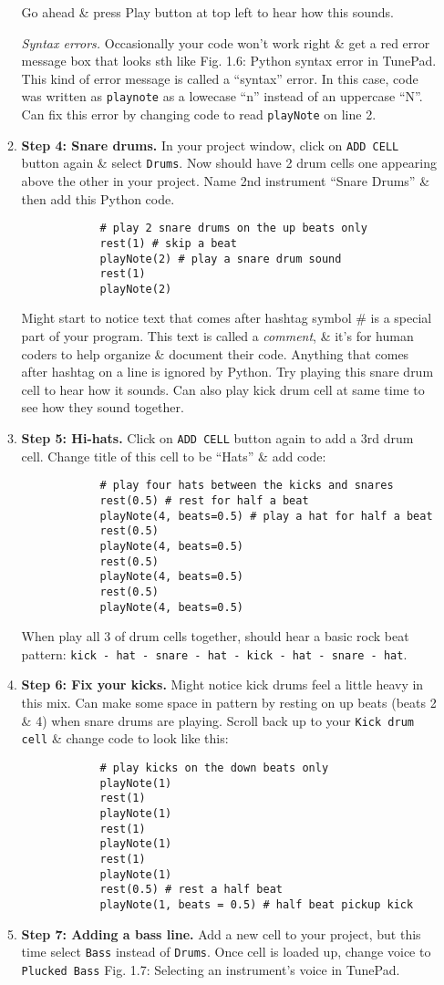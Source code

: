 \documentclass{article}
\begin{document}
\begin{itemize}
\begin{enumerate}
		Go ahead \& press Play button at top left to hear how this sounds.
		
		{\it Syntax errors.} Occasionally your code won't work right \& get a red error message box that looks sth like {\sf Fig. 1.6: Python syntax error in TunePad}. This kind of error message is called a ``syntax'' error. In this case, code was written as {\tt playnote} as a lowecase ``n'' instead of an uppercase ``N''. Can fix this error by changing code to read {\tt playNote} on line 2.
		\item {\bf Step 4: Snare drums.} In your project window, click on {\tt ADD CELL} button again \& select {\tt Drums}. Now should have 2 drum cells one appearing above the other in your project. Name 2nd instrument ``Snare Drums'' \& then add this Python code.
		\begin{verbatim}
			# play 2 snare drums on the up beats only
			rest(1) # skip a beat
			playNote(2) # play a snare drum sound
			rest(1)
			playNote(2)
		\end{verbatim}
		Might start to notice text that comes after hashtag symbol \# is a special part of your program. This text is called a {\it comment}, \& it's for human coders to help organize \& document their code. Anything that comes after hashtag on a line is ignored by Python. Try playing this snare drum cell to hear how it sounds. Can also play kick drum cell at same time to see how they sound together.
		\item {\bf Step 5: Hi-hats.} Click on {\tt ADD CELL} button again to add a 3rd drum cell. Change title of this cell to be ``Hats'' \& add code:
		\begin{verbatim}
			# play four hats between the kicks and snares
			rest(0.5) # rest for half a beat
			playNote(4, beats=0.5) # play a hat for half a beat
			rest(0.5)
			playNote(4, beats=0.5)
			rest(0.5)
			playNote(4, beats=0.5)
			rest(0.5)
			playNote(4, beats=0.5)
		\end{verbatim}
		When play all 3 of drum cells together, should hear a basic rock beat pattern: {\tt kick - hat - snare - hat - kick - hat - snare - hat}.
		\item {\bf Step 6: Fix your kicks.} Might notice kick drums feel a little heavy in this mix. Can make some space in pattern by resting on up beats (beats 2 \& 4) when snare drums are playing. Scroll back up to your {\tt Kick drum cell} \& change code to look like this:
		\begin{verbatim}
			# play kicks on the down beats only
			playNote(1)
			rest(1)
			playNote(1)
			rest(1)
			playNote(1)
			rest(1)
			playNote(1)
			rest(0.5) # rest a half beat
			playNote(1, beats = 0.5) # half beat pickup kick
		\end{verbatim}
		\item {\bf Step 7: Adding a bass line.} Add a new cell to your project, but this time select {\tt Bass} instead of {\tt Drums}. Once cell is loaded up, change voice to {\tt Plucked Bass} {\sf Fig. 1.7: Selecting an instrument's voice in TunePad.}
		

\end{enumerate}
\end{itemize}
\end{document}
